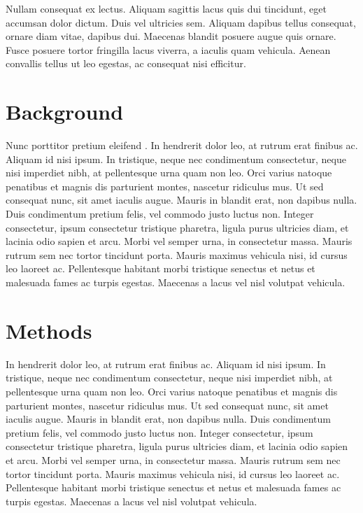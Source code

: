 \documentclass[12pt,letterpaper]{article} %
\begin{document}
Nullam consequat ex lectus. Aliquam sagittis lacus quis dui tincidunt, eget accumsan dolor dictum. Duis vel ultricies sem. Aliquam dapibus tellus consequat, ornare diam vitae, dapibus dui. Maecenas blandit posuere augue quis ornare. Fusce posuere tortor fringilla lacus viverra, a iaculis quam vehicula. Aenean convallis tellus ut leo egestas, ac consequat nisi efficitur.

\section{Background}

Nunc porttitor pretium eleifend \citep{boarnet_travel_2001}. In hendrerit dolor leo, at rutrum erat finibus ac. Aliquam id nisi ipsum. In tristique, neque nec condimentum consectetur, neque nisi imperdiet nibh, at pellentesque urna quam non leo. Orci varius natoque penatibus et magnis dis parturient montes, nascetur ridiculus mus. Ut sed consequat nunc, sit amet iaculis augue. Mauris in blandit erat, non dapibus nulla. Duis condimentum pretium felis, vel commodo justo luctus non. Integer consectetur, ipsum consectetur tristique pharetra, ligula purus ultricies diam, et lacinia odio sapien et arcu. Morbi vel semper urna, in consectetur massa. Mauris rutrum sem nec tortor tincidunt porta. Mauris maximus vehicula nisi, id cursus leo laoreet ac. Pellentesque habitant morbi tristique senectus et netus et malesuada fames ac turpis egestas. Maecenas a lacus vel nisl volutpat vehicula.

\section{Methods}

In hendrerit dolor leo, at rutrum erat finibus ac. Aliquam id nisi ipsum. In tristique, neque nec condimentum consectetur, neque nisi imperdiet nibh, at pellentesque urna quam non leo. Orci varius natoque penatibus et magnis dis parturient montes, nascetur ridiculus mus. Ut sed consequat nunc, sit amet iaculis augue. Mauris in blandit erat, non dapibus nulla. Duis condimentum pretium felis, vel commodo justo luctus non. Integer consectetur, ipsum consectetur tristique pharetra, ligula purus ultricies diam, et lacinia odio sapien et arcu. Morbi vel semper urna, in consectetur massa. Mauris rutrum sem nec tortor tincidunt porta. Mauris maximus vehicula nisi, id cursus leo laoreet ac. Pellentesque habitant morbi tristique senectus et netus et malesuada fames ac turpis egestas. Maecenas a lacus vel nisl volutpat vehicula.
\end{document}

